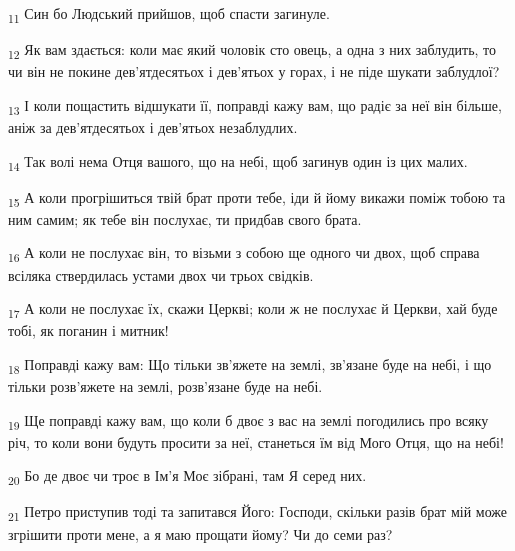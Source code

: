 \begin{tcolorbox}
\textsubscript{11} Син бо Людський прийшов, щоб спасти загинуле.
\end{tcolorbox}
\begin{tcolorbox}
\textsubscript{12} Як вам здається: коли має який чоловік сто овець, а одна з них заблудить, то чи він не покине дев'ятдесятьох і дев'ятьох у горах, і не піде шукати заблудлої?
\end{tcolorbox}
\begin{tcolorbox}
\textsubscript{13} І коли пощастить відшукати її, поправді кажу вам, що радіє за неї він більше, аніж за дев'ятдесятьох і дев'ятьох незаблудлих.
\end{tcolorbox}
\begin{tcolorbox}
\textsubscript{14} Так волі нема Отця вашого, що на небі, щоб загинув один із цих малих.
\end{tcolorbox}
\begin{tcolorbox}
\textsubscript{15} А коли прогрішиться твій брат проти тебе, іди й йому викажи поміж тобою та ним самим; як тебе він послухає, ти придбав свого брата.
\end{tcolorbox}
\begin{tcolorbox}
\textsubscript{16} А коли не послухає він, то візьми з собою ще одного чи двох, щоб справа всіляка ствердилась устами двох чи трьох свідків.
\end{tcolorbox}
\begin{tcolorbox}
\textsubscript{17} А коли не послухає їх, скажи Церкві; коли ж не послухає й Церкви, хай буде тобі, як поганин і митник!
\end{tcolorbox}
\begin{tcolorbox}
\textsubscript{18} Поправді кажу вам: Що тільки зв'яжете на землі, зв'язане буде на небі, і що тільки розв'яжете на землі, розв'язане буде на небі.
\end{tcolorbox}
\begin{tcolorbox}
\textsubscript{19} Ще поправді кажу вам, що коли б двоє з вас на землі погодились про всяку річ, то коли вони будуть просити за неї, станеться їм від Мого Отця, що на небі!
\end{tcolorbox}
\begin{tcolorbox}
\textsubscript{20} Бо де двоє чи троє в Ім'я Моє зібрані, там Я серед них.
\end{tcolorbox}
\begin{tcolorbox}
\textsubscript{21} Петро приступив тоді та запитався Його: Господи, скільки разів брат мій може згрішити проти мене, а я маю прощати йому? Чи до семи раз?
\end{tcolorbox}
